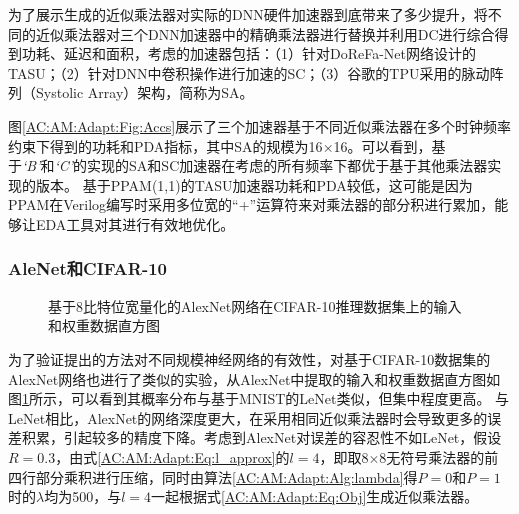 为了展示生成的近似乘法器对实际的DNN硬件加速器到底带来了多少提升，将不同的近似乘法器对三个DNN加速器中的精确乘法器进行替换并利用DC进行综合得到功耗、延迟和面积，考虑的加速器包括：（1）针对DoReFa-Net网络\cite{DNN:DoReFa-Net}设计的TASU\cite{Accelerator:JiaoLi}；（2）针对DNN中卷积操作进行加速的SC\cite{Accelerator:SC}；（3）谷歌的TPU采用的脉动阵列（Systolic Array）架构\cite{Accelerator:TPU}，简称为SA。

图\ref{AC:AM:Adapt:Fig:Accs}展示了三个加速器基于不同近似乘法器在多个时钟频率约束下得到的功耗和PDA指标，其中SA的规模为16$\times$16。可以看到，基于\emph{`B'}和\emph{`C'}的实现的SA和SC加速器在考虑的所有频率下都优于基于其他乘法器实现的版本。
基于PPAM(1,1)的TASU加速器功耗和PDA较低，这可能是因为PPAM在Verilog编写时采用多位宽的“+”运算符来对乘法器的部分积进行累加，能够让EDA工具对其进行有效地优化。

\subsubsection{AleNet和CIFAR-10}

\begin{figure}[!h]
    \centering
    \centering
    \caption{基于8比特位宽量化的AlexNet网络在CIFAR-10推理数据集上的输入和权重数据直方图}
    \label{DNN:LeNet:Fig:AlexNet_CIFAR-10_distribution}
\end{figure}


为了验证提出的方法对不同规模神经网络的有效性，对基于CIFAR-10数据集\cite{DNN:CIFAR-10}的AlexNet网络\cite{DNN:AlexNet}也进行了类似的实验，从AlexNet中提取的输入和权重数据直方图如图\ref{DNN:LeNet:Fig:AlexNet_CIFAR-10_distribution}所示，可以看到其概率分布与基于MNIST的LeNet类似\cite{DNN:LeNet_MNIST}，但集中程度更高。
与LeNet相比，AlexNet的网络深度更大，在采用相同近似乘法器时会导致更多的误差积累，引起较多的精度下降。考虑到AlexNet对误差的容忍性不如LeNet，假设$R=0.3$，由式\eqref{AC:AM:Adapt:Eq:l_approx}的$l=4$，即取8$\times$8无符号乘法器的前四行部分乘积进行压缩，同时由算法\ref{AC:AM:Adapt:Alg:lambda}得$P=0$和$P=1$时的$\lambda$均为500，与$l=4$一起根据式\eqref{AC:AM:Adapt:Eq:Obj}生成近似乘法器。


